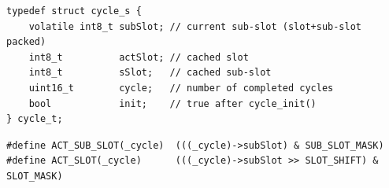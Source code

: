 \begin{listing}
\begin{verbatim}
typedef struct cycle_s {
    volatile int8_t subSlot; // current sub-slot (slot+sub-slot packed)
    int8_t          actSlot; // cached slot
    int8_t          sSlot;   // cached sub-slot
    uint16_t        cycle;   // number of completed cycles
    bool            init;    // true after cycle_init()
} cycle_t;
\end{verbatim}
\caption{Definition of the \texttt{cycle\_t} structure}
\label{cycle_t}
\end{listing}

\begin{listing}
\begin{verbatim}
#define ACT_SUB_SLOT(_cycle)  (((_cycle)->subSlot) & SUB_SLOT_MASK)
#define ACT_SLOT(_cycle)      (((_cycle)->subSlot >> SLOT_SHIFT) & SLOT_MASK)
\end{verbatim}
\caption{Macros for extracting slot and sub-slot}
\label{cycle_macros}
\end{listing}

